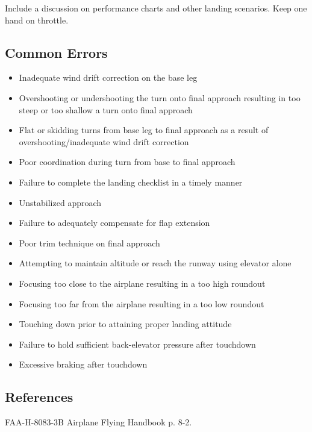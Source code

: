 Include a discussion on performance charts and other landing scenarios. Keep
one hand on throttle.

\subsection{Common Errors}

\begin{itemize}
  \item Inadequate wind drift correction on the base leg
  \item Overshooting or undershooting the turn onto final approach resulting in
    too steep or too shallow a turn onto final approach
  \item Flat or skidding turns from base leg to final approach as a result of
    overshooting/inadequate wind drift correction
  \item Poor coordination during turn from base to final approach
  \item Failure to complete the landing checklist in a timely manner
  \item Unstabilized approach
  \item Failure to adequately compensate for flap extension
  \item Poor trim technique on final approach
  \item Attempting to maintain altitude or reach the runway using elevator
    alone
  \item Focusing too close to the airplane resulting in a too high roundout
  \item Focusing too far from the airplane resulting in a too low roundout
  \item Touching down prior to attaining proper landing attitude
  \item Failure to hold sufficient back-elevator pressure after touchdown
  \item Excessive braking after touchdown
\end{itemize}

\subsection{References}

FAA-H-8083-3B Airplane Flying Handbook p. 8-2.


